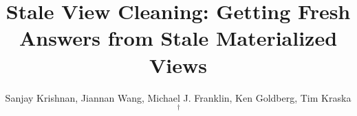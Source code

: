 \documentclass{vldb}
\begin{document}
\newcommand{\reminder}[1]{{{\textcolor{magenta}{\{\{\bf #1\}\}}}\xspace}}
\newcommand{\specialcell}[2][c]{%
  \begin{tabular}[#1]{@{}c@{}}#2\end{tabular}}

\def\ojoin{\setbox0=\hbox{$\bowtie$}%
  \rule[-.02ex]{.25em}{.4pt}\llap{\rule[\ht0]{.25em}{.4pt}}}
\def\leftouterjoin{\mathbin{\ojoin\mkern-5.8mu\bowtie}}
\def\rightouterjoin{\mathbin{\bowtie\mkern-5.8mu\ojoin}}
\def\fullouterjoin{\mathbin{\ojoin\mkern-5.8mu\bowtie\mkern-5.8mu\ojoin}}


\pagestyle{plain}

\title{Stale View Cleaning: Getting Fresh Answers from Stale Materialized Views}

\author{\large Sanjay Krishnan, Jiannan Wang, Michael J. Franklin, Ken Goldberg, Tim Kraska{$\,^\dag$} \\
\vspace{.2em} \\
\vspace{.1em}\\
}






\maketitle

\iffalse
\end{document}
